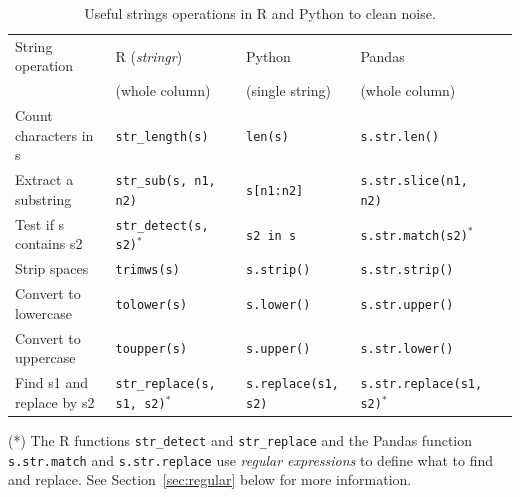 \begin{table}
  \caption{\label{tab:stringoperations}Useful strings operations in R and Python to clean noise.}{
  \begin{tabularx}{\textwidth}{lllll}
    \toprule
    String operation      & R (\index{stringr}\emph{stringr})  & Python  & Pandas\\
                          & (whole column)  & (single string) & (whole column)\\
    \midrule
Count characters in s & \texttt{\small{str\_length(s)}}          & \texttt{\small{len(s)}}        & \texttt{\small{s.str.len()}}  \\
Extract a substring   & \texttt{\small{str\_sub(s, n1, n2)}}     & \texttt{\small{s[n1:n2]}} & \texttt{\small{s.str.slice(n1, n2)}} \\
Test if s contains s2 & \texttt{\small{str\_detect(s, s2)}}$^*$       & \texttt{\small{s2 in s}}       & \texttt{\small{s.str.match(s2)$^*$}} \\
Strip spaces          & \texttt{\small{trimws(s)}}               & \texttt{\small{s.strip()}}     & \texttt{\small{s.str.strip()}} \\
Convert to lowercase  & \texttt{\small{tolower(s)}}              & \texttt{\small{s.lower()}}     & \texttt{\small{s.str.upper()}} \\
Convert to uppercase  & \texttt{\small{toupper(s)}}              & \texttt{\small{s.upper()}}     & \texttt{\small{s.str.lower()}} \\
Find s1 and replace by s2 & \texttt{\small{str\_replace(s, s1, s2)}}$^*$ & \texttt{\small{s.replace(s1, s2)}} & \texttt{\small{s.str.replace(s1, s2)$^*$}}  \\
    \bottomrule
  \end{tabularx}}{(*) The R functions \texttt{\small{str\_detect}} and \texttt{\small{str\_replace}} and the Pandas function \texttt{\small{s.str.match}} and \texttt{\small{s.str.replace}} use \emph{regular expressions} to define what to find and replace. See Section~\ref{sec:regular} below for more information.}
\end{table}

